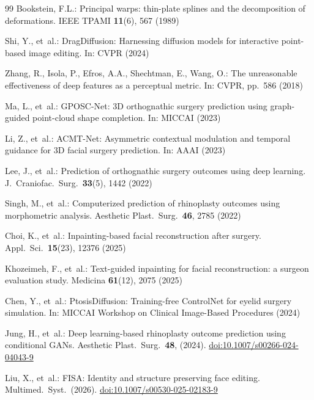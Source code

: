 \documentclass[twocolumn]{article}
\begin{document}
\begin{thebibliography}{99}
Bookstein, F.L.:
Principal warps: thin-plate splines and the decomposition of deformations.
IEEE TPAMI \textbf{11}(6), 567 (1989)

Shi, Y., et~al.:
DragDiffusion: Harnessing diffusion models for interactive point-based
image editing.
In: CVPR (2024)

Zhang, R., Isola, P., Efros, A.A., Shechtman, E., Wang, O.:
The unreasonable effectiveness of deep features as a perceptual metric.
In: CVPR, pp.~586 (2018)

Ma, L., et~al.:
GPOSC-Net: 3D orthognathic surgery prediction using graph-guided
point-cloud shape completion.
In: MICCAI (2023)

Li, Z., et~al.:
ACMT-Net: Asymmetric contextual modulation and temporal guidance for
3D facial surgery prediction.
In: AAAI (2023)

Lee, J., et~al.:
Prediction of orthognathic surgery outcomes using deep learning.
J.\ Craniofac.\ Surg.\ \textbf{33}(5), 1442 (2022)

Singh, M., et~al.:
Computerized prediction of rhinoplasty outcomes using morphometric analysis.
Aesthetic Plast.\ Surg.\ \textbf{46}, 2785 (2022)

Choi, K., et~al.:
Inpainting-based facial reconstruction after surgery.
Appl.\ Sci.\ \textbf{15}(23), 12376 (2025)

Khozeimeh, F., et~al.:
Text-guided inpainting for facial reconstruction: a surgeon evaluation study.
Medicina \textbf{61}(12), 2075 (2025)

Chen, Y., et~al.:
PtosisDiffusion: Training-free ControlNet for eyelid surgery simulation.
In: MICCAI Workshop on Clinical Image-Based Procedures (2024)

Jung, H., et~al.:
Deep learning-based rhinoplasty outcome prediction using conditional GANs.
Aesthetic Plast.\ Surg.\ \textbf{48}, (2024).
\href{https://doi.org/10.1007/s00266-024-04043-9}{doi:10.1007/s00266-024-04043-9}

Liu, X., et~al.:
FISA: Identity and structure preserving face editing.
Multimed.\ Syst.\ (2026).
\href{https://doi.org/10.1007/s00530-025-02183-9}{doi:10.1007/s00530-025-02183-9}


\end{thebibliography}
\end{document}
